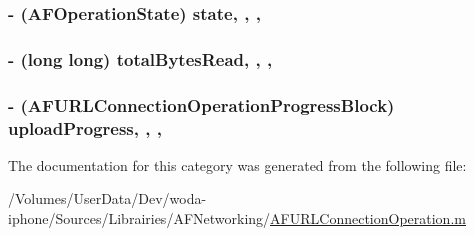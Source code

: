 \hypertarget{category_a_f_u_r_l_connection_operation_07_08_a6a1365f049676a63b618117ebbf066e5}{
\subsubsection[{state}]{\setlength{\rightskip}{0pt plus 5cm}-\/ ({\bf A\-F\-Operation\-State}) state\hspace{0.3cm}{\ttfamily [read]}, {\ttfamily [write]}, {\ttfamily [nonatomic]}, {\ttfamily [assign]}}}\label{category_a_f_u_r_l_connection_operation_07_08_a6a1365f049676a63b618117ebbf066e5}
\hypertarget{category_a_f_u_r_l_connection_operation_07_08_a08a500031a7a4cd7cfa97f041b471a31}{
\subsubsection[{total\-Bytes\-Read}]{\setlength{\rightskip}{0pt plus 5cm}-\/ (long long) total\-Bytes\-Read\hspace{0.3cm}{\ttfamily [read]}, {\ttfamily [write]}, {\ttfamily [nonatomic]}, {\ttfamily [assign]}}}\label{category_a_f_u_r_l_connection_operation_07_08_a08a500031a7a4cd7cfa97f041b471a31}
\hypertarget{category_a_f_u_r_l_connection_operation_07_08_afe3a5f549dbbda0c5706cd6d7da0590d}{
\subsubsection[{upload\-Progress}]{\setlength{\rightskip}{0pt plus 5cm}-\/ ({\bf A\-F\-U\-R\-L\-Connection\-Operation\-Progress\-Block}) upload\-Progress\hspace{0.3cm}{\ttfamily [read]}, {\ttfamily [write]}, {\ttfamily [nonatomic]}, {\ttfamily [copy]}}}\label{category_a_f_u_r_l_connection_operation_07_08_afe3a5f549dbbda0c5706cd6d7da0590d}


The documentation for this category was generated from the following file\-:\begin{DoxyCompactItemize}
\item 
/\-Volumes/\-User\-Data/\-Dev/woda-\/iphone/\-Sources/\-Librairies/\-A\-F\-Networking/\hyperlink{_a_f_u_r_l_connection_operation_8m}{A\-F\-U\-R\-L\-Connection\-Operation.\-m}\end{DoxyCompactItemize}
